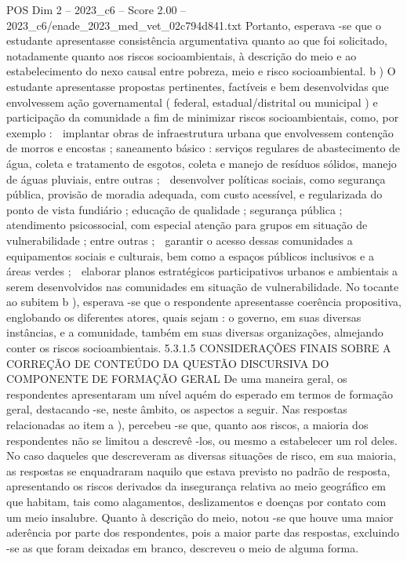 \begin{textsample}{POS Dim 2 – 2023\_c6 – Score 2.00 – 2023\_c6/enade\_2023\_med\_vet\_02c794d841.txt}
Portanto, esperava -se que o estudante apresentasse consistência argumentativa quanto ao que foi solicitado, notadamente quanto aos riscos socioambientais, à descrição do meio e ao estabelecimento do nexo causal entre pobreza, meio e risco socioambiental. b ) O estudante apresentasse propostas pertinentes, factíveis e bem desenvolvidas que envolvessem ação governamental ( federal, estadual/distrital ou municipal ) e participação da comunidade a fim de minimizar riscos socioambientais, como, por exemplo :  implantar obras de infraestrutura urbana que envolvessem contenção de morros e encostas ; saneamento básico : serviços regulares de abastecimento de água, coleta e tratamento de esgotos, coleta e manejo de resíduos sólidos, manejo de águas pluviais, entre outras ;  desenvolver políticas sociais, como segurança pública, provisão de moradia adequada, com custo acessível, e regularizada do ponto de vista fundiário ; educação de qualidade ; segurança pública ; atendimento psicossocial, com especial atenção para grupos em situação de vulnerabilidade ; entre outras ;  garantir o acesso dessas comunidades a equipamentos sociais e culturais, bem como a espaços públicos inclusivos e a áreas verdes ;  elaborar planos estratégicos participativos urbanos e ambientais a serem desenvolvidos nas comunidades em situação de vulnerabilidade.
No tocante ao subitem b ), esperava -se que o respondente apresentasse coerência propositiva, englobando os diferentes atores, quais sejam : o governo, em suas diversas instâncias, e a comunidade, também em suas diversas organizações, almejando conter os riscos socioambientais. 5.3.1.5 CONSIDERAÇÕES FINAIS SOBRE A CORREÇÃO DE CONTEÚDO DA QUESTÃO DISCURSIVA DO COMPONENTE DE FORMAÇÃO GERAL De uma maneira geral, os respondentes apresentaram um nível aquém do esperado em termos de formação geral, destacando -se, neste âmbito, os aspectos a seguir.
Nas respostas relacionadas ao item a ), percebeu -se que, quanto aos riscos, a maioria dos respondentes não se limitou a descrevê -los, ou mesmo a estabelecer um rol deles.
No caso daqueles que descreveram as diversas situações de risco, em sua maioria, as respostas se enquadraram naquilo que estava previsto no padrão de resposta, apresentando os riscos derivados da insegurança relativa ao meio geográfico em que habitam, tais como alagamentos, deslizamentos e doenças por contato com um meio insalubre.
Quanto à descrição do meio, notou -se que houve uma maior aderência por parte dos respondentes, pois a maior parte das respostas, excluindo -se as que foram deixadas em branco, descreveu o meio de alguma forma.

\end{textsample}

